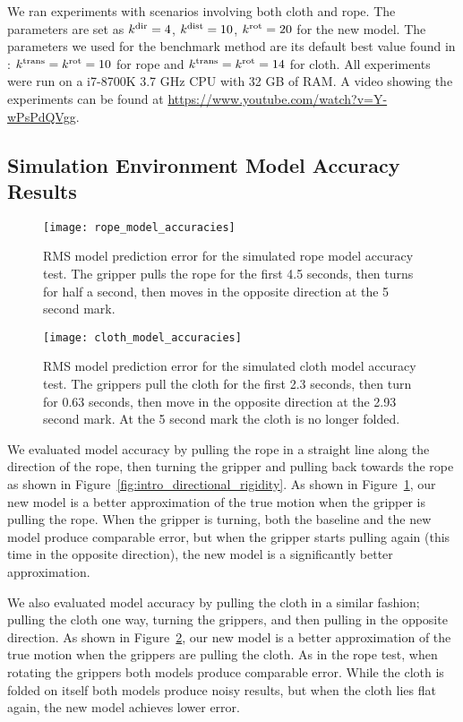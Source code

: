We ran experiments with scenarios involving both cloth and rope. The parameters are set as $k^\textrm{dir} = 4$, $k^\textrm{dist} = 10$, $k^{\textrm{rot}} = 20$ for the new model. The parameters we used for the benchmark method are its default best value found in \cite{Berenson2013}: $k^{\textrm{trans}} = k^{\textrm{rot}} = 10$ for rope and $k^{\textrm{trans}} = k^{\textrm{rot}} = 14$ for cloth. All experiments were run on a i7-8700K 3.7 GHz CPU with 32 GB of RAM. A video showing the experiments can be found at \url{https://www.youtube.com/watch?v=Y-wPsPdQVgg}.

\subsection{Simulation Environment Model Accuracy Results}

\begin{figure}[ht]
    \centering
    \texttt{[image: rope\_model\_accuracies]}
    \caption{RMS model prediction error for the simulated rope model accuracy test. The gripper pulls the rope for the first 4.5 seconds, then turns for half a second, then moves in the opposite direction at the 5 second mark.}
    \label{fig:rope_model_accuracy_plot}
\end{figure}

\begin{figure}[ht]
    \centering
    \texttt{[image: cloth\_model\_accuracies]}
    \caption{RMS model prediction error for the simulated cloth model accuracy test. The grippers pull the cloth for the first 2.3 seconds, then turn for 0.63 seconds, then move in the opposite direction at the 2.93 second mark. At the 5 second mark the cloth is no longer folded. }
    \label{fig:cloth_model_accuracy_plot}
\end{figure}

We evaluated model accuracy by pulling the rope in a straight line along the direction of the rope, then turning the gripper and pulling back towards the rope as shown in Figure~\ref{fig:intro_directional_rigidity}. As shown in Figure~\ref{fig:rope_model_accuracy_plot}, our new model is a better approximation of the true motion when the gripper is pulling the rope. When the gripper is turning, both the baseline and the new model produce comparable error, but when the gripper starts pulling again (this time in the opposite direction), the new model is a significantly better approximation.

We also evaluated model accuracy by pulling the cloth in a similar fashion; pulling the cloth one way, turning the grippers, and then pulling in the opposite direction. As shown in Figure~\ref{fig:cloth_model_accuracy_plot}, our new model is a better approximation of the true motion when the grippers are pulling the cloth. As in the rope test, when rotating the grippers both models produce comparable error. While the cloth is folded on itself both models produce noisy results, but when the cloth lies flat again, the new model achieves lower error.



